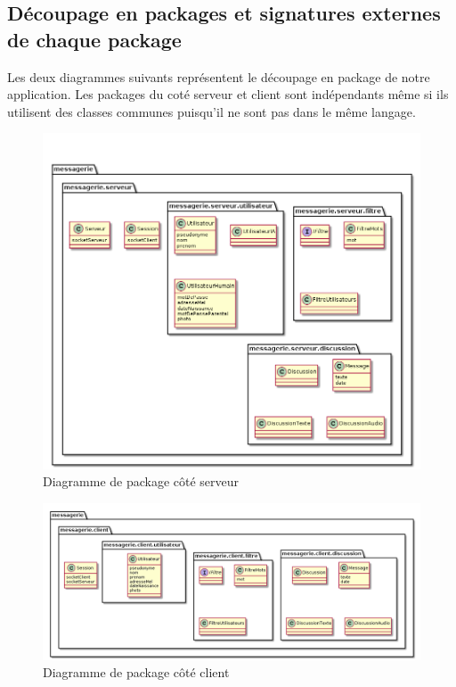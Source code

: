	\newpage

	\subsection{Découpage en packages et signatures externes de chaque package}
	Les deux diagrammes suivants représentent le découpage en package de notre application.
	Les packages du coté serveur et client sont indépendants même si ils utilisent des classes communes puisqu'il ne sont pas dans le même langage.
	
	\begin{figure}[H]
	\centerline{\includegraphics[width=16.5cm]{img/packageServeur.png}}
		\caption{Diagramme de package côté serveur}
	\end{figure}

	\begin{figure}[H]
	\centerline{\includegraphics[width=16.5cm]{img/packageClient.png}}
	\caption{Diagramme de package côté client}
	\end{figure}